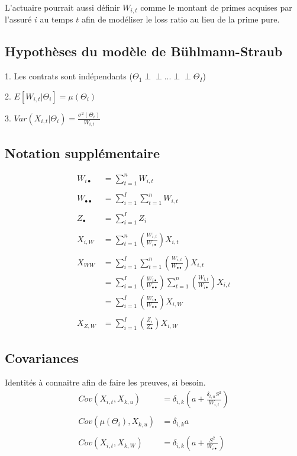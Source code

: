 L'actuaire pourrait aussi définir $W_{i,t}$ comme le montant de primes acquises par l'assuré $i$ au temps $t$ afin de modéliser le loss ratio au lieu de la prime pure.

\subsection{Hypothèses du modèle de Bühlmann-Straub}

1. Les contrats sont indépendants ($\Theta_1 {\perp\!\!\!\perp} ... {\perp\!\!\!\perp} \Theta_I$)

2. $E[W_{i,t}|\Theta_i] = \mu(\Theta_i)$

3. $Var(X_{i,t}|\Theta_i) = \frac{\sigma^2(\Theta_i)}{W_{i,t}}$

\subsection{ Notation supplémentaire}
$$\boxed{\begin{aligned}
W_{i\bullet} &= \sum_{t=1}^n W_{i,t} \\ \\
W_{\bullet \bullet} &= \sum_{i=1}^I \sum_{t=1}^{n} W_{i,t} \\ \\ 
Z_{\bullet} &= \sum_{i=1}^I Z_i \\ \\
X_{i,W} &= \sum_{t=1}^n \left(\frac{W_{i,t}}{W_{i \bullet}} \right) X_{i,t} \\ \\
X_{WW} &= \sum_{i=1}^I \sum_{t=1}^n \left(\frac{W_{i,t}}{W_{\bullet \bullet}} \right) X_{i,t} \\
&= \sum_{i=1}^I \left(\frac{W_{i \bullet}}{W_{\bullet \bullet}} \right) \sum_{t=1}^n \left(\frac{W_{i,t}}{W_{i \bullet}} \right)X_{i,t} \\
&= \sum_{i=1}^I \left(\frac{W_{i \bullet}}{W_{\bullet \bullet}} \right) X_{i,W} \\ \\
X_{Z,W} &= \sum_{i=1}^I \left(\frac{Z_i}{Z_{\bullet}} \right) X_{i,W}
\end{aligned}}$$

\subsection{Covariances } 
Identités à connaitre afin de faire les preuves, si besoin.
$$\boxed{\begin{aligned}
Cov(X_{i,t},X_{k,u}) &= \delta_{i,k}\left(a + \frac{\delta_{t,u}S^2}{W_{i,t}} \right) \\ \\
Cov(\mu(\Theta_i),X_{k,u}) &= \delta_{i,k} a \\ \\
Cov(X_{i,t},X_{k,W}) &= \delta_{i,k}\left(a + \frac{S^2}{W_{i \bullet}} \right)
\end{aligned}}$$

